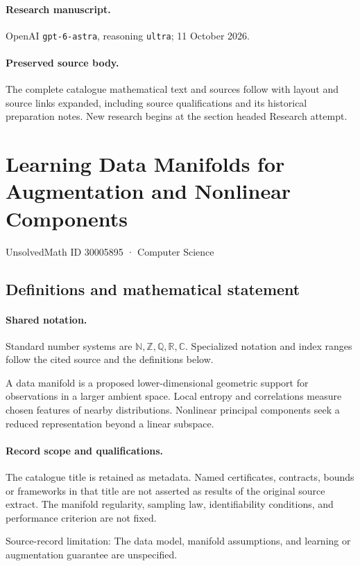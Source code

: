 \documentclass[11pt]{article}
\begin{document}
\paragraph{Research manuscript.} OpenAI \texttt{gpt-6-astra}, reasoning \texttt{ultra}; 11 October 2026.
\paragraph{Preserved source body.} The complete catalogue mathematical text and sources follow with layout and source links expanded, including source qualifications and its historical preparation notes. New research begins at the section headed Research attempt.

\section{Learning Data Manifolds for Augmentation and Nonlinear Components}\label{30005895}
{\small UnsolvedMath ID 30005895 · Computer Science}
\subsection{Definitions and mathematical statement}

\paragraph{Shared notation.}Standard number systems are $\mathbb N,\mathbb Z,\mathbb Q,\mathbb R,\mathbb C$. Specialized notation and index ranges follow the cited source and the definitions below.


A data manifold is a proposed lower-dimensional geometric support for observations in a larger ambient space. Local entropy and correlations measure chosen features of nearby distributions. Nonlinear principal components seek a reduced representation beyond a linear subspace.
\paragraph{Record scope and qualifications.}
The catalogue title is retained as metadata. Named certificates, contracts, bounds or frameworks in that title are not asserted as results of the original source extract.
The manifold regularity, sampling law, identifiability conditions, and performance criterion are not fixed.

Source-record limitation: The data model, manifold assumptions, and learning or augmentation guarantee are unspecified.
\end{document}
